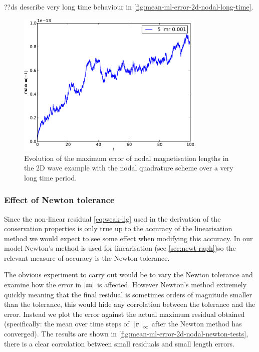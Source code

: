 ??ds describe very long time behaviour in \autoref{fig:mean-ml-error-2d-nodal-long-time}.

\begin{figure}
  \centering
  \includegraphics[width=0.8\textwidth]{plots/2d_wave_solution_m_length_long_time/-maxmathbfm-1vst.pdf}
  \caption{Evolution of the maximum error of nodal magnetisation lengths in the 2D wave example with the nodal quadrature scheme over a very long time period.}
  \label{fig:mean-ml-error-2d-nodal-long-time}
\end{figure}



\subsubsection{Effect of Newton tolerance}
\label{sec:effect-newt-toler-m-conservation}

Since the non-linear residual \eqref{eq:weak-llg} used in the derivation of the conservation properties is only true up to the accuracy of the linearisation method we would expect to see some effect when modifying this accuracy.
In our model Newton's method is used for linearisation (see \autoref{sec:newt-raph})so the relevant measure of accuracy is the Newton tolerance.

The obvious experiment to carry out would be to vary the Newton tolerance and examine how the error in $\left|{\mathbf{m}} \right|$ is affected.
However Newton's method extremely quickly meaning that the final residual is sometimes orders of magnitude smaller than the tolerance, this would hide any corrolation between the tolerance and the error.
Instead we plot the error against the actual maximum residual obtained (specifically: the mean over time steps of $\left| \left| \mathbf{r} \right| \right|_\infty$ after the Newton method has converged). 
The results are shown in \autoref{fig:mean-ml-error-2d-nodal-newton-tests}, there is a clear corrolation between small residuals and small length errors.


